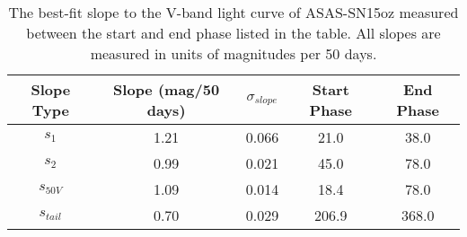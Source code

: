 \begin{table*}
\centering
\caption{The best-fit slope to the V-band light curve of ASAS-SN15oz measured between the start and end phase listed in the table. All slopes are measured in units of magnitudes per 50 days.}
\begin{tabular}{ccccc}
Slope Type & Slope (mag/50 days) & $\sigma_{slope}$ & Start Phase & End Phase \\
\hline
$s_1$ & 1.21 & 0.066 & 21.0 & 38.0 \\
$s_2$ & 0.99 & 0.021 & 45.0 & 78.0 \\
$s_{50V}$ & 1.09 & 0.014 & 18.4 & 78.0 \\
$s_{tail}$ & 0.70 & 0.029 & 206.9 & 368.0 \\
\end{tabular}
\end{table*}
